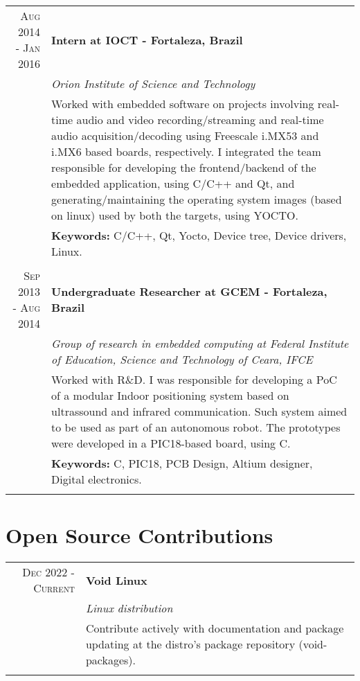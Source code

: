 \documentclass[a4paper,10pt]{article}
\begin{document}
  \begin{tabular}{r|p{11cm}}
    \textsc{Aug 2014 - Jan 2016} & \textbf{Intern at IOCT - Fortaleza, Brazil}\\&\emph{Orion Institute of Science and Technology}\\&\footnotesize{Worked with embedded software on projects involving real-time audio and video recording/streaming and real-time audio acquisition/decoding using Freescale i.MX53 and i.MX6 based boards, respectively. I integrated the team responsible for developing the frontend/backend of the embedded application, using C/C++ and Qt, and generating/maintaining the operating system images (based on linux) used by both the targets, using YOCTO.}
    \\ & \footnotesize{\textbf{Keywords:} C/C++, Qt, Yocto, Device tree, Device drivers, Linux.}
    \\\multicolumn{2}{c}{} \\

    \textsc{Sep 2013 - Aug 2014} & \textbf{Undergraduate Researcher at GCEM - Fortaleza, Brazil} \\&\emph{Group of research in embedded computing at Federal Institute of Education,
    Science and Technology of Ceara, IFCE}\\&\footnotesize{Worked with R\&D. I was responsible for developing a PoC of a modular Indoor positioning system based on ultrassound and infrared communication. Such system aimed to be used as part of an autonomous robot. The prototypes were developed in a PIC18-based board, using C.}
    \\ & \footnotesize{\textbf{Keywords:} C, PIC18, PCB Design, Altium designer, Digital electronics.}
    \\\multicolumn{2}{c}{}

  \end{tabular}

  \section{Open Source Contributions}
  \begin{tabular}{r|p{11cm}}
    \textsc{Dec 2022 - Current} & \textbf{Void Linux} \\&\emph{Linux distribution}
    \\&\footnotesize{Contribute actively with documentation and package updating at the distro's package repository (void-packages).}
    \\\multicolumn{2}{c}{}
  \end{tabular}
\end{document}
